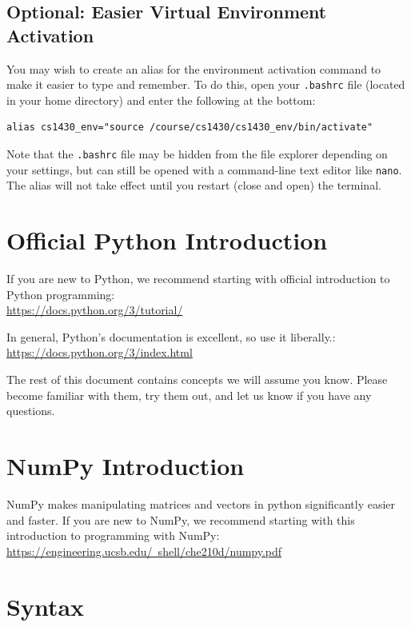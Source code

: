 \documentclass{article}
\begin{document}
\subsection{Optional: Easier Virtual Environment Activation}
\label{sec:venvactivation}

You may wish to create an alias for the environment activation command to make it easier to type and remember. To do this, open your \texttt{.bashrc} file (located in your home directory) and enter the following at the bottom:
\begin{verbatim}
alias cs1430_env="source /course/cs1430/cs1430_env/bin/activate"
\end{verbatim}

Note that the \texttt{.bashrc} file may be hidden from the file explorer depending on your settings, but can still be opened with a command-line text editor like \texttt{nano}. The alias will not take effect until you restart (close and open) the terminal.

\section{Official Python Introduction}
If you are new to Python, we recommend starting with official introduction to Python programming:\\
\href{https://docs.python.org/3/tutorial/}{https://docs.python.org/3/tutorial/}

In general, Python's documentation is excellent, so use it liberally.:\\
\href{https://docs.python.org/3/index.html}{https://docs.python.org/3/index.html}

The rest of this document contains concepts we will assume you know. Please become familiar with them, try them out, and let us know if you have any questions.


\section{NumPy Introduction}
NumPy makes manipulating matrices and vectors in python significantly easier and faster.
If you are new to NumPy, we recommend starting with this introduction to programming with NumPy:\\
\href{https://engineering.ucsb.edu/~shell/che210d/numpy.pdf}{https://engineering.ucsb.edu/~shell/che210d/numpy.pdf}


\section{Syntax}
\end{document}
